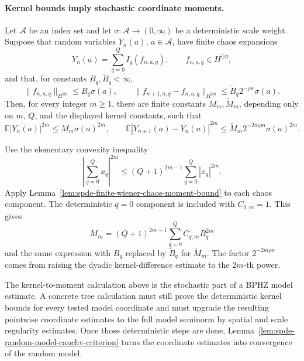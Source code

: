 \paragraph{Kernel bounds imply stochastic coordinate moments.}
Let \(\mathcal A\) be an index set and let
\(\sigma:\mathcal A\to(0,\infty)\) be a deterministic scale weight.  Suppose
that random variables \(Y_n(a)\), \(a\in\mathcal A\), have finite chaos
expansions
\[
  Y_n(a)=\sum_{q=0}^Q I_q(f_{n,a,q}),
  \qquad f_{n,a,q}\in H^{\odot q},
\]
and that, for constants \(B_q,\widetilde B_q<\infty\),
\[
  \|f_{n,a,q}\|_{H^{\otimes q}}\leq B_q\sigma(a),
  \qquad
  \|f_{n+1,a,q}-f_{n,a,q}\|_{H^{\otimes q}}
  \leq
  \widetilde B_q2^{-\rho n}\sigma(a).
\]
Then, for every integer \(m\geq1\), there are finite constants
\(M_m,\widetilde M_m\), depending only on \(m\), \(Q\), and the displayed
kernel constants, such that
\[
  \mathbb E|Y_n(a)|^{2m}\leq M_m\sigma(a)^{2m},
  \qquad
  \mathbb E|Y_{n+1}(a)-Y_n(a)|^{2m}
  \leq
  \widetilde M_m2^{-2m\rho n}\sigma(a)^{2m}.
\]

Use the elementary convexity inequality
\[
  \left|\sum_{q=0}^Q x_q\right|^{2m}
  \leq
  (Q+1)^{2m-1}\sum_{q=0}^Q |x_q|^{2m}.
\]
Apply Lemma~\ref{lem:spde-finite-wiener-chaos-moment-bound} to each chaos
component.  The deterministic \(q=0\) component is included with
\(C_{0,m}=1\).  This gives
\[
  M_m
  =
  (Q+1)^{2m-1}
  \sum_{q=0}^Q C_{q,m}B_q^{2m}
\]
and the same expression with \(B_q\) replaced by \(\widetilde B_q\) for
\(\widetilde M_m\).  The factor \(2^{-2m\rho n}\) comes from raising the
dyadic kernel-difference estimate to the \(2m\)-th power.

The kernel-to-moment calculation above is the stochastic part of a BPHZ model
estimate.  A concrete tree calculation must still prove
the deterministic kernel bounds for every tested model coordinate and must
upgrade the resulting pointwise coordinate estimates to the full model
seminorm by spatial and scale regularity estimates.  Once those deterministic
steps are done, Lemma~\ref{lem:spde-random-model-cauchy-criterion} turns
the coordinate estimates into convergence of the random model.

